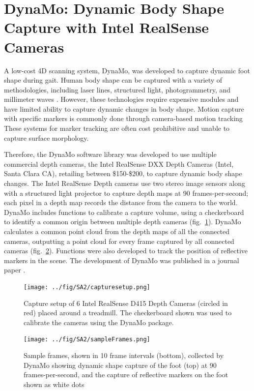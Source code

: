 \documentclass[defaultstyle,11pt]{thesis}
\begin{document}
\hypertarget{dynamo-dynamic-body-shape-capture-with-intel-realsense-cameras}{%
\section{DynaMo: Dynamic Body Shape Capture with Intel RealSense Cameras}\label{dynamo-dynamic-body-shape-capture-with-intel-realsense-cameras}}

A low-cost 4D scanning system, DynaMo, was developed to capture dynamic foot shape during gait.
Human body shape can be captured with a variety of methodologies, including laser lines, structured light, photogrammetry, and millimeter waves \citep{Daanen2013}.
However, these technologies require expensive modules and have limited ability to capture dynamic changes in body shape.
Motion capture with specific markers is commonly done through camera-based motion tracking \citep{Windolf2008}
These systems for marker tracking are often cost prohibitive and unable to capture surface morphology.

Therefore, the DynaMo software library was developed to use multiple commercial depth cameras, the Intel RealSense DXX Depth Cameras (Intel, Santa Clara CA), retailing between \$150-\$200, to capture dynamic body shape changes.
The Intel RealSense Depth cameras use two stereo image sensors along with a structured light projector to capture depth maps at 90 frames-per-second; each pixel in a depth map records the distance from the camera to the world.
DynaMo includes functions to calibrate a capture volume, using a checkerboard to identify a common origin between multiple depth cameras (fig.~\ref{fig:testSetup}).
DynaMo calculates a common point cloud from the depth maps of all the connected cameras, outputting a point cloud for every frame captured by all connected cameras (fig.~\ref{fig:SA2-sampleFrames}).
Functions were also developed to track the position of reflective markers in the scene.
The development of DynaMo was published in a journal paper \citep{Boppana2019}.

\begin{figure}
\hypertarget{fig:testSetup}{%
\centering
\texttt{[image: ../fig/SA2/capturesetup.png]}
\caption{Capture setup of 6 Intel RealSense D415 Depth Cameras (circled in red) placed around a treadmill. The checkerboard shown was used to calibrate the cameras using the DynaMo package.}\label{fig:testSetup}
}
\end{figure}

\begin{figure}
\hypertarget{fig:SA2-sampleFrames}{%
\centering
\texttt{[image: ../fig/SA2/sampleFrames.png]}
\caption{Sample frames, shown in 10 frame intervals (bottom), collected by DynaMo showing dynamic shape capture of the foot (top) at 90 frames-per-second, and the capture of reflective markers on the foot shown as white dots}\label{fig:SA2-sampleFrames}
}
\end{figure}
\end{document}
